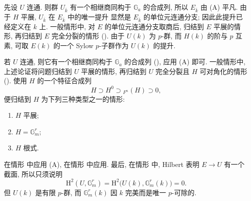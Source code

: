 先设 \(U\) 连通.
则群 \(U_{\overline{k}}\) 有一个相继商同构于 \(\mathbb G_a\) 的合成列,
所以 \(E_{\overline{k}}\) 由 (A) 平凡.
由于 \(H\) 平展, \(U_{\overline{k}}\) 在 \(E_{\overline{k}}\) 中的唯一提升
显然是 \(E_{\overline{k}}\) 的单位元连通分支;
因此此提升已经定义在 \(k\) 上.
一般情形中, 对 \(E\) 的单位元连通分支取商后,
归结到 \(E\) 平展的情形, 再归结到 \(E\) 完全分裂的情形
().
由于 \(U(k)\) 为 \(p\)-群, 而 \(H(k)\) 的阶与 \(p\) 互素,
可取 \(E(k)\) 的一个 Sylow \(p\)-子群作为 \(U(k)\) 的提升.

若 \(U\) 连通, 则它有一个相继商同构于 \(\mathbb G_a\) 的合成列
(), 应用 (A) 即可.
一般情形中, 上述论证将问题归结到 \(U\) 平展的情形,
再归结到 \(U\) 完全分裂且 \(H\) 可对角化的情形
().
使用 \(H\) 的一个特征合成列
\[
  H\supset H^0\supset{}_{F^n}(H)\supset0,
\]
便归结到 \(H\) 为下列三种类型之一的情形:
\begin{enumerate}
\item[(a)] \(H\) 平展;
\item[(b)] \(H=\mathbb G_m^r\);
\item[(c)] \(H\) 根式.
\end{enumerate}
在情形 中应用 (A),
在情形 中应用.
最后, 在情形 中,
Hilbert  表明 \(E\longrightarrow U\) 有一个截面,
所以只须说明
\[
  \mathrm H^2(U,\mathbb G_m^r)
    =\mathrm H^2\bigl(U(k),\mathbb G_m^r(k)\bigr)=0.
\]
但 \(U(k)\) 是有限 \(p\)-群, 而 \(\mathbb G_m^r(k)\)
因 \(k\) 完美而是唯一 \(p\)-可除的.


